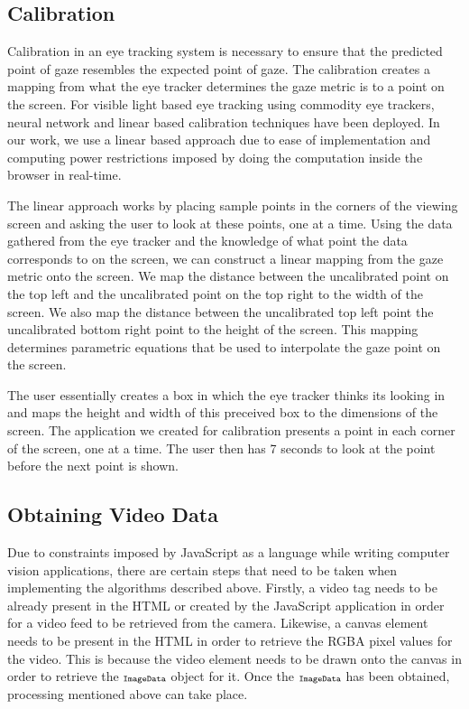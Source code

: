 \documentclass[annual]{acmsiggraph}
\newcommand{\Acronym}[1]{\ensuremath{{\small{\texttt{#1}}}}}
\begin{document}
\subsection{Calibration}

Calibration in an eye tracking system is necessary to ensure that the predicted
point of gaze resembles the expected point of gaze. The calibration creates a
mapping from what the eye tracker determines the gaze metric is to a point on
the screen. For visible light based eye tracking using commodity eye trackers,
neural network \cite{holland2012eye} and linear based calibration techniques
have been deployed. In our work, we use a linear based approach due to ease of
implementation and computing power restrictions imposed by doing the
computation inside the browser in real-time.

The linear approach works by placing sample points in the corners of the
viewing screen and asking the user to look at these points, one at a time.
Using the data gathered from the eye tracker and the knowledge of what point
the data corresponds to on the screen, we can construct a linear mapping from
the gaze metric onto the screen. We map the distance between the uncalibrated
point on the top left and  the uncalibrated point on the top right to the width
of the screen.  We also map the distance between the uncalibrated top left
point the uncalibrated bottom right point to the height of the screen. This
mapping determines parametric equations that be used to interpolate the gaze
point on the screen.

The user essentially creates a box in which the eye tracker thinks its looking
in and maps the height and width of this preceived box to the dimensions of the
screen. The application we created for calibration presents a point in each
corner of the screen, one at a time. The user then has 7 seconds to look at the
point before the next point is shown.

\subsection{Obtaining Video Data}

%
%
%

Due to constraints imposed by JavaScript as a language while writing computer
vision applications, there are certain steps that need to be taken when
implementing the algorithms described above. Firstly, a video tag needs to be
already present in the HTML or created by the JavaScript application in order
for a video feed to be retrieved from the camera. Likewise, a canvas element
needs to be present in the HTML in order to retrieve the RGBA pixel values for
the video.  This is because the video element needs to be drawn onto the canvas
in order to retrieve the $\Acronym{ImageData}$ object for it. Once the
$\Acronym{ImageData}$ has been obtained, processing mentioned above can take
place.
\end{document}
